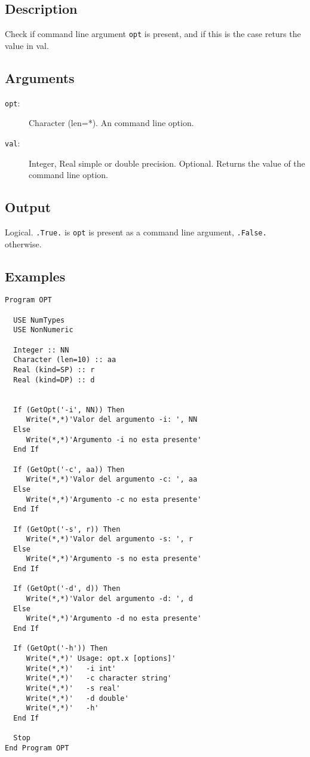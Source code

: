 \subsection{Description}

Check if command line argument \texttt{opt} is present, and if this is
the case returs the value in val. 

\subsection{Arguments}

\begin{description}
\item[\texttt{opt}: ] Character (len=*). An command line option.
\item[\texttt{val}: ] Integer, Real simple or double
  precision. Optional. Returns the value of the command line option.
\end{description}

\subsection{Output}

Logical. \texttt{.True.} is \texttt{opt} is present as a command line
argument, \texttt{.False.} otherwise.

\subsection{Examples}

\begin{lstlisting}[emph=GetOpt,
                   emphstyle=\color{blue},
                   frame=trBL,
                   caption=Obtainning command line arguments.,
                   label=nol]
Program OPT

  USE NumTypes
  USE NonNumeric

  Integer :: NN
  Character (len=10) :: aa
  Real (kind=SP) :: r
  Real (kind=DP) :: d


  If (GetOpt('-i', NN)) Then
     Write(*,*)'Valor del argumento -i: ', NN
  Else
     Write(*,*)'Argumento -i no esta presente'
  End If

  If (GetOpt('-c', aa)) Then
     Write(*,*)'Valor del argumento -c: ', aa
  Else
     Write(*,*)'Argumento -c no esta presente'
  End If

  If (GetOpt('-s', r)) Then
     Write(*,*)'Valor del argumento -s: ', r
  Else
     Write(*,*)'Argumento -s no esta presente'
  End If

  If (GetOpt('-d', d)) Then
     Write(*,*)'Valor del argumento -d: ', d
  Else
     Write(*,*)'Argumento -d no esta presente'
  End If

  If (GetOpt('-h')) Then
     Write(*,*)' Usage: opt.x [options]'
     Write(*,*)'   -i int'
     Write(*,*)'   -c character string'
     Write(*,*)'   -s real'
     Write(*,*)'   -d double'
     Write(*,*)'   -h'
  End If

  Stop
End Program OPT
\end{lstlisting}



